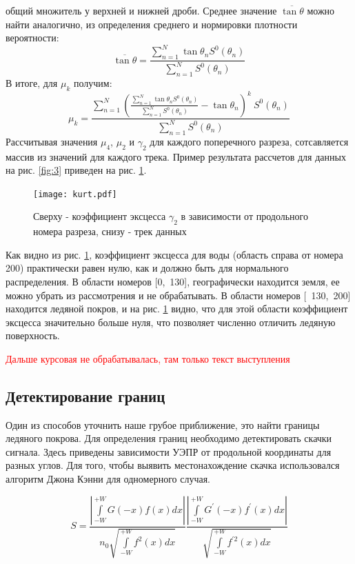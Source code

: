общий множитель у верхней и нижней дроби. Среднее значение $\overline{\tan\theta}$ можно найти аналогично, из
определения среднего и нормировки плотности вероятности:
\begin{equation}
  \overline{\tan\theta} = \frac{\sum \limits_{n = 1}^{N} \tan \theta_n S^0(\theta_n) }{\sum \limits_{n = 1}^{N} S^0(\theta_n)}
  \label{eq:18}
\end{equation}
В итоге, для $\mu_k$ получим:
\begin{equation}
  \mu_k = \frac{\sum \limits_{n = 1}^{N} (\frac{\sum \limits_{n = 1}^{N} \tan \theta_n S^0(\theta_n) }{\sum \limits_{n = 1}^{N} S^0(\theta_n)} - \tan \theta_n)^k~ S^0(\theta_n)}{\sum \limits_{n = 1}^{N} S^0(\theta_n) }
  \label{eq:19}
\end{equation}
Рассчитывая значения $\mu_4$, $\mu_2$ и $\gamma_2$ для каждого поперечного разреза, сотсавляется массив из значений для
каждого трека. Пример результата рассчетов для данных на рис. \ref{fig:3} приведен на рис. \ref{fig:6}.
\begin{figure}[h!]
  \centering
    \texttt{[image: kurt.pdf]}
  \caption{Сверху - коэффициент эксцесса $\gamma_2$ в зависимости от продольного номера разреза, снизу - трек данных}
  \label{fig:6}
\end{figure}

Как видно из рис. \ref{fig:6}, коэффициент эксцесса для воды (область справа от номера 200) практически равен нулю, как
и должно быть для нормального распределения. В области номеров [0,~130], географически находится
земля, ее можно убрать из рассмотрения и не обрабатывать. В области номеров [~130,~200] находится ледяной покров, и на  рис. \ref{fig:6}
видно, что для этой области коэффициент эксцесса значительно больше нуля, что позволяет численно отличить ледяную поверхность.




\textcolor{red}{Дальше курсовая не обрабатывалась, там только текст выступления}
\subsection{Детектирование границ}
Один из способов уточнить наше грубое приближение, это найти границы ледяного покрова.
Для определения границ необходимо детектировать скачки сигнала. Здесь приведены зависимости УЭПР от продольной
координаты для разных углов. Для того, чтобы выявить местонахождение скачка использовался алгоритм Джона Кэнни \cite{canny} для
одномерного случая.

\begin{equation}
  S = \frac{\left|\int \limits_{-W}^{+W} G(-x) f(x) d x\right|}{n_{0} \sqrt{\int \limits_{-W}^{+W} f^{2}(x) d x}} \frac{\left|\int \limits_{-W}^{+W} G^{\prime}(-x) f^{\prime}(x) d x\right|}{\sqrt{\int \limits_{-W}^{+W} f^{\prime 2}(x) d x}}
  \label{eq:S}
\end{equation}

